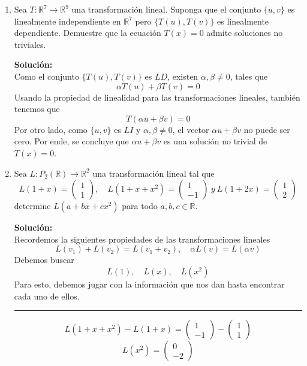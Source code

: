 \documentclass[12pt]{article}
\newenvironment{solucion}
{\begin{mdframed}[backgroundcolor=black!10]
		{\bf Solución:}\\
	}
	{
	\end{mdframed}
}
\newenvironment{preguntas}
{\begin{enumerate}\itemsep12pt
	}
	{
	\end{enumerate}
}
\newcommand{\ra}{\rightarrow}
\newcommand{\R}{\mathbb{R}}
\begin{document}
\begin{preguntas}
Demuestre que $A$ no es invertible.
\begin{solucion}
Como por lo menos alguna de las columnas de $B$ es $b_i \neq \vec{0}$, la ecuación $Ax = 0$ posee una solución no trivial $x = b_i$, por lo que no puede ser invertible, ya que sus columnas son $LD$
\end{solucion}
\item Sea $T: \R^7 \ra \R^9$ una transformación lineal. Suponga que el conjunto $\{u,v\}$ es linealmente independiente en $\R^7$ pero $\{T(u), T(v)\}$ es linealmente dependiente. Demuestre que la ecuación $T(x)=0$ admite soluciones no triviales.
\begin{solucion}
Como el conjunto $\{T(u), T(v)\}$ es $LD$, existen $\alpha, \beta \neq 0$, tales que 
$$\alpha T(u) + \beta T(v) = 0$$
Usando la propiedad de linealidad para las transformaciones lineales, también tenemos que
$$ T(\alpha u +\beta v) = 0$$
Por otro lado, como $\{u, v\}$ es $LI$ y $\alpha, \beta \neq 0$, el vector $\alpha u +\beta v$ no puede ser cero. Por ende, se concluye que $\alpha u +\beta v$ es una solución no trivial de $T(x) = 0$.
\end{solucion}
\item Sea $L: P_2(\R) \ra \R^2$ una transformación lineal tal que
	$$L(1+x) = \begin{pmatrix}
	1\\
	1
	\end{pmatrix}, \quad L(1+x+x^2) = \begin{pmatrix}
	1\\
	-1
	\end{pmatrix}\ y \ L(1+2x) = \begin{pmatrix}
	1\\
	2
	\end{pmatrix}$$
	determine $L(a+bx+cx^2)$ para todo $a,b,c \in \R$.
\begin{solucion}
Recordemos la siguientes propiedades de las transformaciones lineales
		$$L(v_1) + L(v_2) = L(v_1 + v_2), \quad \alpha L(v) = L(\alpha v)$$
		Debemos buscar 
		$$L(1), \quad L(x), \quad L(x^2)$$
		Para esto, debemos jugar con la información que nos dan hasta encontrar cada uno de ellos.
		\begin{center}\rule{14.5cm}{0.1pt}\end{center}
		$$L(1+x+x^2) - L(1+x) = \begin{pmatrix}
		1\\-1
		\end{pmatrix} - \begin{pmatrix}
		1\\1
		\end{pmatrix}$$
		$$L(x^2) = \begin{pmatrix}
		0\\-2
		\end{pmatrix}$$
		

\end{solucion}
\end{preguntas}
\end{document}

